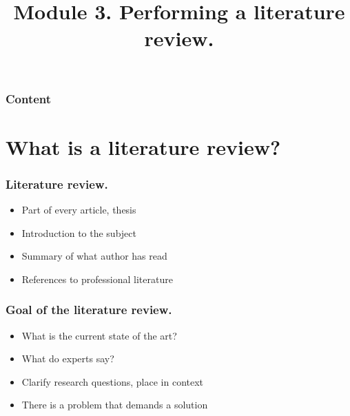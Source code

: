 \documentclass[aspectratio=169]{beamer}
\title{Module 3. Performing a literature review.}
\subtitle{\coursename}
\author{\lecturers}   %
\date{\academicyear}
\begin{document}
\begin{frame}
    \maketitle
\end{frame}

\begin{frame}
    \frametitle{Content}

    \tableofcontents
\end{frame}

\section{What is a literature review?}

\begin{frame}
    \frametitle{Literature review.}

    \begin{itemize}
        \item Part of every article, thesis
        \item Introduction to the subject
        \item Summary of what author has read
        \item References to professional literature
    \end{itemize}

\end{frame}

\begin{frame}
    \frametitle{Goal of the literature review.}

    \begin{itemize}
        \item What is the current state of the art?
        \item What do experts say?
        \item Clarify research questions, place in context
        \item There is a problem that demands a solution
    \end{itemize}

    \bigskip

\end{frame}
\end{document}

